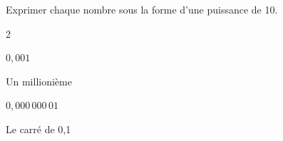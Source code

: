 \documentclass[exercice]{thedocument}%
\begin{document}
%
\begin{flushleft}
    Exprimer chaque nombre sous la forme d'une puissance de 10.
\end{flushleft}
\begin{enumerate}
    \begin{multicols}{2}
        \item$0,001$
        \item Un millionième
        \item$0,000\,000\,01$
        \item Le carré de 0,1
    \end{multicols}
\end{enumerate}
\end{document}

